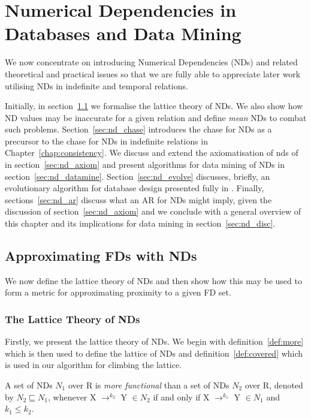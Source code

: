 \chapter{Numerical Dependencies in Databases and Data
Mining}\label{chap:numdep}

We now concentrate on introducing Numerical Dependencies (NDs) and
related theoretical and practical issues so that we are fully able to
appreciate later work utilising NDs in indefinite and temporal
relations.

\medskip

Initially, in section~\ref{sec:nd_approx} we formalise the lattice theory
of NDs. We also show how ND values may be inaccurate for a given
relation and define {\em mean} NDs to combat such
problems. Section~\ref{sec:nd_chase} introduces the chase for NDs as a
precursor to the chase for NDs in indefinite relations in
Chapter~\ref{chap:consistency}. We discuss and extend the
axiomatisation of nds of \cite{gm85a} in section~\ref{sec:nd_axiom}
and present algorithms for data mining of NDs in
section~\ref{sec:nd_datamine}. Section~\ref{sec:nd_evolve} discusses,
briefly, an evolutionary algorithm for database design presented fully
in \cite{cl96}. Finally, sections~\ref{sec:nd_ar} discuss what an AR
for NDs might imply, given the discussion of
section~\ref{sec:nd_axiom} and we conclude with a general overview of
this chapter and its implications for data mining in section~\ref{sec:nd_disc}.


\section{Approximating FDs with NDs}\label{sec:nd_approx}

We now define the lattice theory of NDs and then show how this may be
used to form a metric for approximating proximity to a given FD set. 

\subsection{The Lattice Theory of NDs}

Firstly, we present the lattice theory of NDs. We begin with
definition~\ref{def:more} which is then used to define the lattice of
NDs and definition~\ref{def:covered} which is used in our algorithm
for climbing the lattice.


\begin{definition}\label{def:more}
\begin{rm}
A set of NDs $N_1$ over R is {\em more functional} than a set of NDs 
$N_2$ over R, denoted by $N_2 \sqsubseteq N_1$, whenever
X $\to^{k_2}$ Y $\in N_2$ if and only if X $\to^{k_1}$ Y $\in N_1$ and 
$k_1 \le k_2$. 
\end{rm}
\end{definition}
\medskip

